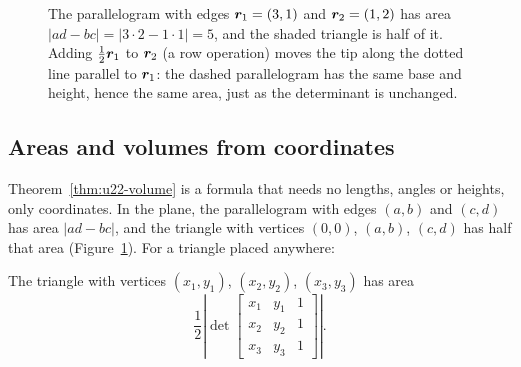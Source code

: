 \begin{figure}[ht]\centering
{}
\caption{The parallelogram with edges $\boldsymbol{r}_1=(3,1)$ and $\boldsymbol{r}_2=(1,2)$ has area
$|ad-bc|=|3\cdot 2-1\cdot 1|=5$, and the shaded triangle is half of it. Adding
$\tfrac12\boldsymbol{r}_1$ to $\boldsymbol{r}_2$ (a row operation) moves the tip along the dotted line
parallel to $\boldsymbol{r}_1$: the dashed parallelogram has the same base and height, hence the
same area, just as the determinant is unchanged.}
\label{fig:u22-area}
\end{figure}

\subsection{Areas and volumes from coordinates}

Theorem~\ref{thm:u22-volume} is a formula that needs no lengths, angles or heights, only
coordinates. In the plane, the parallelogram with edges $(a,b)$ and $(c,d)$ has area
$|ad-bc|$, and the triangle with vertices $(0,0)$, $(a,b)$, $(c,d)$ has half that area
(Figure~\ref{fig:u22-area}). For a triangle placed anywhere:

\begin{proposition}\label{prop:u22-triangle}
The triangle with vertices $(x_1,y_1)$, $(x_2,y_2)$, $(x_3,y_3)$ has area
\[
  \frac12\left|\det\begin{bmatrix} x_1&y_1&1\\ x_2&y_2&1\\ x_3&y_3&1\end{bmatrix}\right| .
\]
\end{proposition}

